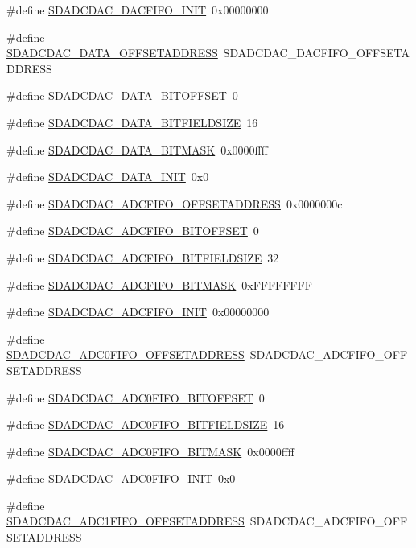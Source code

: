 \begin{DoxyCompactItemize}
\item 
\#define \hyperlink{a00569_aff3d9bf2490423215cf58067f24e6ae6}{SDADCDAC\_\-DACFIFO\_\-INIT}~0x00000000
\item 
\#define \hyperlink{a00569_a694f011c19f6c8951731bcdd5aad55df}{SDADCDAC\_\-DATA\_\-OFFSETADDRESS}~SDADCDAC\_\-DACFIFO\_\-OFFSETADDRESS
\item 
\#define \hyperlink{a00569_a21d42a078533d3f75a7830588e3e70e1}{SDADCDAC\_\-DATA\_\-BITOFFSET}~0
\item 
\#define \hyperlink{a00569_a9b722f858bbc14a8b6dc171e282f0701}{SDADCDAC\_\-DATA\_\-BITFIELDSIZE}~16
\item 
\#define \hyperlink{a00569_aaa154fbecfd9b4163653263258da0a73}{SDADCDAC\_\-DATA\_\-BITMASK}~0x0000ffff
\item 
\#define \hyperlink{a00569_a23c48f1b8295ea1f395cc142e7db202d}{SDADCDAC\_\-DATA\_\-INIT}~0x0
\item 
\#define \hyperlink{a00569_a7285fb57f8b7c471423e4b48f76e7e91}{SDADCDAC\_\-ADCFIFO\_\-OFFSETADDRESS}~0x0000000c
\item 
\#define \hyperlink{a00569_a2a9c5e8e1426037ea183a34f6631f9ed}{SDADCDAC\_\-ADCFIFO\_\-BITOFFSET}~0
\item 
\#define \hyperlink{a00569_acc1d07aad5b03e80ff7581f8553393db}{SDADCDAC\_\-ADCFIFO\_\-BITFIELDSIZE}~32
\item 
\#define \hyperlink{a00569_a7d1cf7eb25a6bac72e4c0718f55ed6f7}{SDADCDAC\_\-ADCFIFO\_\-BITMASK}~0xFFFFFFFF
\item 
\#define \hyperlink{a00569_afc9538df8c1d8c884819473bacc15fba}{SDADCDAC\_\-ADCFIFO\_\-INIT}~0x00000000
\item 
\#define \hyperlink{a00569_a8b4f0e34f3af46e8edbc21f358ebfe25}{SDADCDAC\_\-ADC0FIFO\_\-OFFSETADDRESS}~SDADCDAC\_\-ADCFIFO\_\-OFFSETADDRESS
\item 
\#define \hyperlink{a00569_a980876b5b7124d3460f79010b575a58d}{SDADCDAC\_\-ADC0FIFO\_\-BITOFFSET}~0
\item 
\#define \hyperlink{a00569_a235118d606b477faeeaf4cfc896f67ac}{SDADCDAC\_\-ADC0FIFO\_\-BITFIELDSIZE}~16
\item 
\#define \hyperlink{a00569_ae91a3ea06f7d860cd769501e6ac611ae}{SDADCDAC\_\-ADC0FIFO\_\-BITMASK}~0x0000ffff
\item 
\#define \hyperlink{a00569_a7597c1191c8f81f621998b90e8e4a09f}{SDADCDAC\_\-ADC0FIFO\_\-INIT}~0x0
\item 
\#define \hyperlink{a00569_a5e57d2b0298a5b3cfa8161c2972faecb}{SDADCDAC\_\-ADC1FIFO\_\-OFFSETADDRESS}~SDADCDAC\_\-ADCFIFO\_\-OFFSETADDRESS

\end{DoxyCompactItemize}
